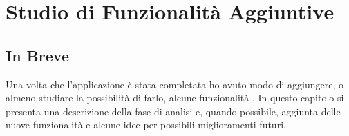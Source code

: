 \chapter{Studio di Funzionalità Aggiuntive}

\section{In Breve}
Una volta che l'applicazione è stata completata  ho avuto modo di aggiungere, o almeno studiare la possibilità di farlo, alcune funzionalità .
In questo capitolo si presenta una descrizione della fase di analisi e, quando possibile, aggiunta delle nuove funzionalità e alcune idee per possibili miglioramenti futuri.